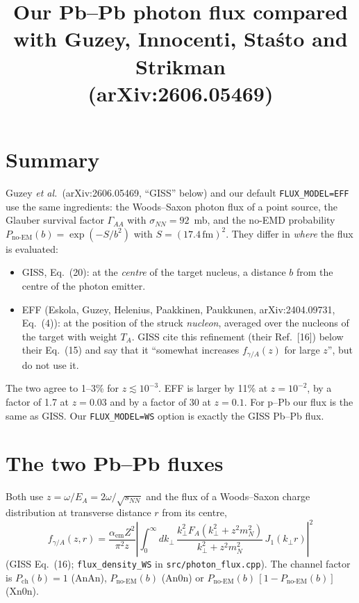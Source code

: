 \documentclass[11pt]{article}
\title{Our Pb--Pb photon flux compared with Guzey, Innocenti, Sta\'sto and Strikman\\
(arXiv:2606.05469)}
\author{}
\date{}
\begin{document}
\maketitle

\section{Summary}

Guzey \textit{et al.}\ (arXiv:2606.05469, ``GISS'' below) and our default \texttt{FLUX\_MODEL=EFF}
use the same ingredients: the Woods--Saxon photon flux of a point source, the Glauber
survival factor $\Gamma_{AA}$ with $\sigma_{NN}=92$~mb, and the no-EMD probability
$P_{\text{no-EM}}(b)=\exp(-S/b^2)$ with $S=(17.4\,\text{fm})^2$. They differ in
\emph{where} the flux is evaluated:
\begin{itemize}
\item GISS, Eq.~(20): at the \emph{centre} of the target nucleus, a distance $b$ from the
  centre of the photon emitter.
\item EFF (Eskola, Guzey, Helenius, Paakkinen, Paukkunen, arXiv:2404.09731, Eq.~(4)): at the
  position of the struck \emph{nucleon}, averaged over the nucleons of the target with weight
  $T_A$. GISS cite this refinement (their Ref.~[16]) below their Eq.~(15) and say that it
  ``somewhat increases $f_{\gamma/A}(z)$ for large $z$'', but do not use it.
\end{itemize}
The two agree to 1--3\% for $z\lesssim 10^{-3}$. EFF is larger by 11\% at $z=10^{-2}$, by a
factor of 1.7 at $z=0.03$ and by a factor of 30 at $z=0.1$. For p--Pb our flux is the same as
GISS. Our \texttt{FLUX\_MODEL=WS} option is exactly the GISS Pb--Pb flux.

\section{The two Pb--Pb fluxes}

Both use $z=\omega/E_A=2\omega/\sqrt{s_{NN}}$ and the flux of a Woods--Saxon charge
distribution at transverse distance $r$ from its centre,
\begin{equation}
  f_{\gamma/A}(z,r)=\frac{\alpha_{\text{em}}Z^2}{\pi^2 z}
  \left|\int_0^\infty dk_\perp\,\frac{k_\perp^2 F_A(k_\perp^2+z^2m_N^2)}{k_\perp^2+z^2m_N^2}\,
  J_1(k_\perp r)\right|^2
\end{equation}
(GISS Eq.~(16); \texttt{flux\_density\_WS} in \texttt{src/photon\_flux.cpp}). The channel factor
is $P_{\text{ch}}(b)=1$ (AnAn), $P_{\text{no-EM}}(b)$ (An0n) or
$P_{\text{no-EM}}(b)\,[1-P_{\text{no-EM}}(b)]$ (Xn0n).
\end{document}
